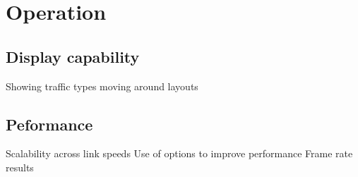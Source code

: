 \section{Operation}
\label{operation}

\subsection{Display capability}
Showing traffic types
moving around
layouts


\subsection{Peformance}

Scalability across link speeds
Use of options to improve performance
Frame rate results

